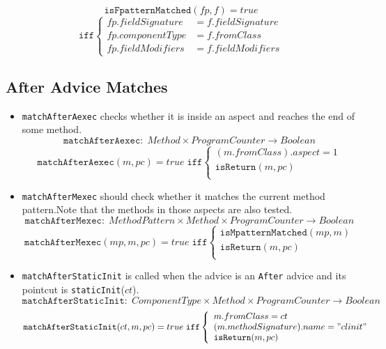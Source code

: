 \begin{itemize}
\begin{multicols}{2}
$$ \texttt{isFpatternMatched}(fp,f)=true$$
$$\texttt{iff}\left\{\begin{aligned}
fp.fieldSignature&=f.fieldSignature\\
fp.componentType&=f.fromClass\\
fp.fieldModifiers&=f.fieldModifiers
\end{aligned}
\right.$$
\end{multicols}


\end{itemize}


\subsection{After Advice Matches}
\begin{itemize}
  \item \texttt{matchAfterAexec} checks whether it is inside an aspect and reaches the end of some method.
$$\texttt{matchAfterAexec}:\;Method\times ProgramCounter\rightarrow Boolean$$
$$\texttt{matchAfterAexec}(m,pc)=true\;\texttt{iff}\left\{
\begin{array}{l}
  (m.fromClass).aspect=1\\
  \texttt{isReturn}(m,pc)\\
\end{array}\right.$$
  \item \texttt{matchAfterMexec} should check whether it matches the current method pattern.Note that the methods in those aspects are also tested.
$$\texttt{matchAfterMexec}:\;MethodPattern\times Method\times ProgramCounter\rightarrow Boolean$$
$$\texttt{matchAfterMexec}(mp,m,pc)=true\;\texttt{iff}\left\{
\begin{array}{l}
\texttt{isMpatternMatched}(mp,m)\\
\texttt{isReturn}(m,pc)\\
\end{array}\right.$$
  \item \texttt{matchAfterStaticInit} is called when the advice is an \texttt{After} advice and its pointcut is \texttt{staticInit}($ct$).
$$\texttt{matchAfterStaticInit}:\;ComponentType\times Method\times ProgramCounter\rightarrow Boolean$$
$$\texttt{matchAfterStaticInit}(ct,m,pc)=true\;\texttt{iff}\left\{
\begin{array}{l}
m.fromClass=ct\\
(m.methodSignature).name="clinit"\\
\texttt{isReturn}(m,pc)\\
\end{array}\right.$$


\end{itemize}
